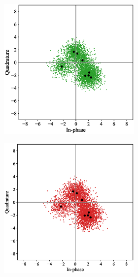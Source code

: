 \begin{figure}[tp!]
	\center
	\begin{subfigure}{0.325\linewidth}
		\begin{subfigure}{0.48\textwidth}
			\includegraphics[width=\linewidth]{figs/awgn_normal_constellation}
		\end{subfigure}
		\hfill
		\begin{subfigure}{0.48\textwidth}
			\includegraphics[width=\linewidth]{figs/awgn_covert_constellation}

\end{subfigure}
\end{subfigure}
\end{figure}
